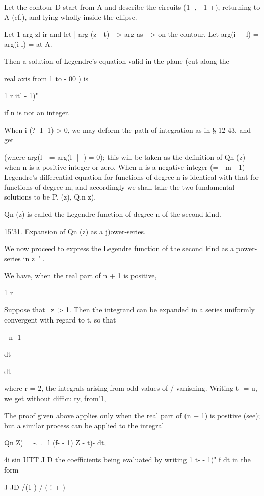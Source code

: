 {{Let the contour D start from A and describe the circuits (1 -, - 1
+), returning to A (cf.), and lying wholly inside the ellipse.

Let 1 arg zl ir and let | arg (z - t) - > arg as - > on the contour.
Let arg(i + l) = arg(i-l) = at A.

Then a solution of Legendre's equation valid in the plane (cut along
the

real axis from 1 to - 00 ) is

1 r it' - 1)"

if n is not an integer.

When i (? -I- 1) > 0, we may deform the path of integration as in §
12-43, and get

(where arg(l - = arg(l -|- ) = 0); this will be taken as the
definition of Qn (z) when n is a positive integer or zero. When n is a
negative integer (= - m - 1) Legendre's differential equation for
functions of degree n is identical with that for functions of degree
m, and accordingly we shall take the two fundamental solutions to be
P. (z), Q,n z).

Qn (z) is called the Legendre function of degree n of the second kind.

%
%

15'31. Expansion of Qn (z) as a j)ower-series.

We now proceed to express the Legendre function of the second kind as
a power-series in z~' .

We have, when the real part of n + 1 is positive,

1 r

Suppose that \ z\ > 1. Then the integrand can be expanded in a series
uniformly convergent with regard to t, so that

- n- 1

dt

dt

where r = 2, the integrals arising from odd values of / vanishing.
Writing t- = u, we get without difficulty, from'1,

The proof given above applies only when the real part of (n + 1) is
positive (see); but a similar process can be applied to the
integral

Qn Z) = -. . \ l (f- - 1) Z - t)- dt,

4i sin UTT J D the coefficients being evaluated by writing 1 t- - 1)"
f dt in the form

J JD /(1-) / (-! + )

}}

